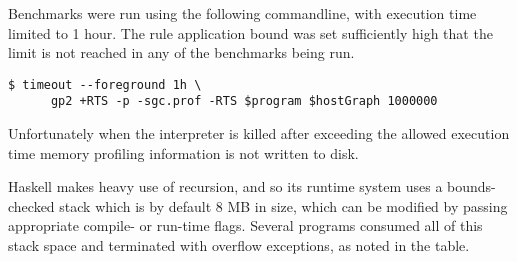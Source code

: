 Benchmarks were run using the following commandline, with execution time limited to 1 hour. The rule application bound was set sufficiently high that the limit is not reached in any of the benchmarks being run.

\begin{verbatim}
$ timeout --foreground 1h \
      gp2 +RTS -p -sgc.prof -RTS $program $hostGraph 1000000
\end{verbatim}

Unfortunately when the interpreter is killed after exceeding the allowed execution time memory profiling information is not written to disk.



Haskell makes heavy use of recursion, and so its runtime system uses a bounds-checked stack which is by default 8 MB in size, which can be modified by passing appropriate compile- or run-time flags. Several programs consumed all of this stack space and terminated with overflow exceptions, as noted in the table. %





